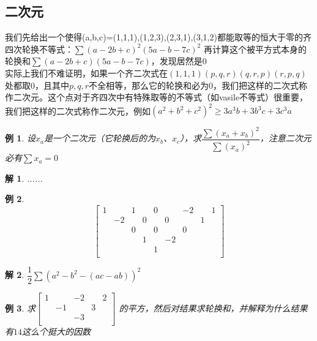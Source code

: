 \documentclass[UTF8]{ctexart}
\newtheorem{1}{例}
\newtheorem{2}{解}
\begin{document}
\subsection{二次元}
我们先给出一个使得(a,b,c)=(1,1,1),(1,2,3),(2,3,1),(3,1,2)都能取等的恒大于零的齐四次轮换不等式：$ \displaystyle \sum (a-2b+c)^{2}(5a-b-7c)^{2} $
再计算这个被平方式本身的轮换和$ \displaystyle \sum (a-2b+c)(5a-b-7c) $，发现居然是$ 0 $\\
实际上我们不难证明，如果一个齐二次式在$ (1,1,1)(p,q,r)(q,r,p)(r,p,q) $处都取$ 0 $，且其中$ p,q,r $不全相等，那么它的轮换和必为$ 0 $，我们把这样的二次式称作二次元。这个点对于齐四次中有特殊取等的不等式（如vasile不等式）很重要，我们把这样的二次式称作二次元，例如$ (a^{2}+b^{2}+c^{2})^{2}\geq 3a^{3}b+3b^{3}c+3c^{3}a $
\begin{1}
设$ x_{a} $是一个二次元（它轮换后的为$ x_{b} $、$ x_{c} $），求$ \dfrac{\displaystyle \sum (x_{a}+x_{b})^{2}}{\displaystyle \sum (x_{a})^{2}}$，注意二次元必有$ \displaystyle \sum x_{a}=0 $	
\end{1}
\begin{2}
	......
\end{2}
\begin{1}
	\renewcommand*{\arraystretch}{1.732}\[
	\left[\begin{matrix}
		1& &1& &0& &-2& &1\\
		&-2& &0& &0& &1&\\
		& &0& &0& &0& &\\
		& & &1& &-2& & &\\
		& & & &1& & & &\\
	\end{matrix}\right]
	\]
\end{1}
\begin{2}
	$ \dfrac{1}{2}\sum (a^{2}-b^{2}-(ac-ab))^{2} $
\end{2}
\begin{1}
	求$ \left[\begin{matrix}
		1& &-2& &2\\
		&-1& &3&\\
		& &-3& &\\
	\end{matrix}\right] $
的平方，然后对结果求轮换和，并解释为什么结果有$ 14 $这么个挺大的因数
\end{1}
\end{document}
